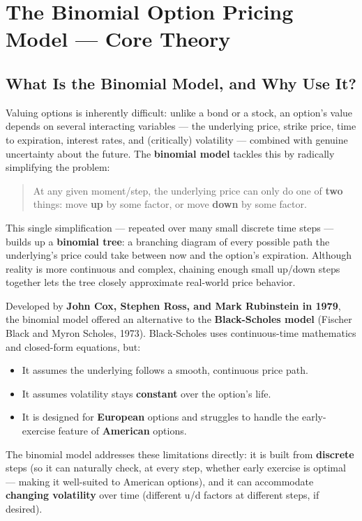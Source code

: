 \documentclass[12pt,openany]{book}
\theoremstyle{definition}
\theoremstyle{remark}
\begin{document}
\setcounter{section}{5}

\section{The Binomial Option Pricing Model — Core Theory}

\subsection{What Is the Binomial Model, and Why Use It?}

Valuing options is inherently difficult: unlike a bond or a stock, an option's value depends on several interacting variables — the underlying price, strike price, time to expiration, interest rates, and (critically) volatility — combined with genuine uncertainty about the future. The \textbf{binomial model} tackles this by radically simplifying the problem:

\begin{quote}
At any given moment/step, the underlying price can only do one of \textbf{two} things: move \textbf{up} by some factor, or move \textbf{down} by some factor.
\end{quote}

This single simplification — repeated over many small discrete time steps — builds up a \textbf{binomial tree}: a branching diagram of every possible path the underlying's price could take between now and the option's expiration. Although reality is more continuous and complex, chaining enough small up/down steps together lets the tree closely approximate real-world price behavior.

Developed by \textbf{John Cox, Stephen Ross, and Mark Rubinstein in 1979}, the binomial model offered an alternative to the \textbf{Black-Scholes model} (Fischer Black and Myron Scholes, 1973). Black-Scholes uses continuous-time mathematics and closed-form equations, but:
\begin{itemize}
\item It assumes the underlying follows a smooth, continuous price path.
\item It assumes volatility stays \textbf{constant} over the option's life.
\item It is designed for \textbf{European} options and struggles to handle the early-exercise feature of \textbf{American} options.
\end{itemize}
The binomial model addresses these limitations directly: it is built from \textbf{discrete} steps (so it can naturally check, at every step, whether early exercise is optimal — making it well-suited to American options), and it can accommodate \textbf{changing volatility} over time (different u/d factors at different steps, if desired).
\end{document}
